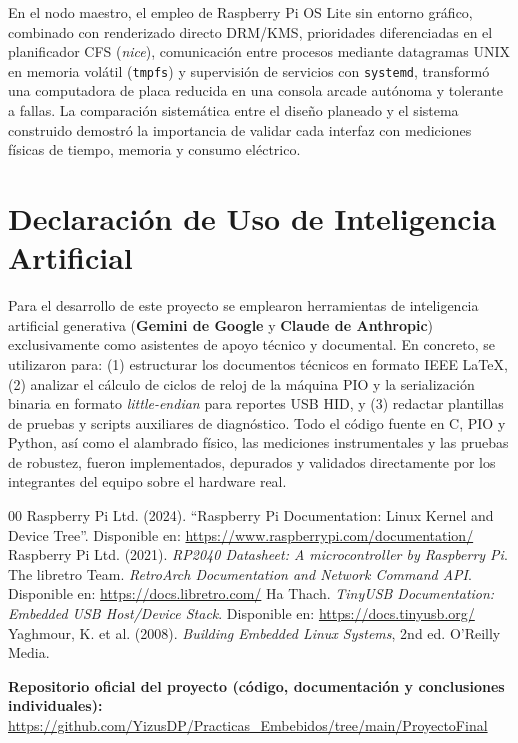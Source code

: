\documentclass[conference]{IEEEtran}
\begin{document}
En el nodo maestro, el empleo de Raspberry Pi OS Lite sin entorno gráfico, combinado con renderizado directo DRM/KMS, prioridades diferenciadas en el planificador CFS (\textit{nice}), comunicación entre procesos mediante datagramas UNIX en memoria volátil (\texttt{tmpfs}) y supervisión de servicios con \texttt{systemd}, transformó una computadora de placa reducida en una consola arcade autónoma y tolerante a fallas. La comparación sistemática entre el diseño planeado y el sistema construido demostró la importancia de validar cada interfaz con mediciones físicas de tiempo, memoria y consumo eléctrico.

\section{Declaración de Uso de Inteligencia Artificial}

Para el desarrollo de este proyecto se emplearon herramientas de inteligencia artificial generativa (\textbf{Gemini de Google} y \textbf{Claude de Anthropic}) exclusivamente como asistentes de apoyo técnico y documental. En concreto, se utilizaron para: (1) estructurar los documentos técnicos en formato IEEE \LaTeX{}, (2) analizar el cálculo de ciclos de reloj de la máquina PIO y la serialización binaria en formato \textit{little-endian} para reportes USB HID, y (3) redactar plantillas de pruebas y scripts auxiliares de diagnóstico. Todo el código fuente en C, PIO y Python, así como el alambrado físico, las mediciones instrumentales y las pruebas de robustez, fueron implementados, depurados y validados directamente por los integrantes del equipo sobre el hardware real.

\begin{thebibliography}{00}
	 Raspberry Pi Ltd. (2024). ``Raspberry Pi Documentation: Linux Kernel and Device Tree''. Disponible en: \url{https://www.raspberrypi.com/documentation/}
	 Raspberry Pi Ltd. (2021). \textit{RP2040 Datasheet: A microcontroller by Raspberry Pi}.
	 The libretro Team. \textit{RetroArch Documentation and Network Command API}. Disponible en: \url{https://docs.libretro.com/}
	 Ha Thach. \textit{TinyUSB Documentation: Embedded USB Host/Device Stack}. Disponible en: \url{https://docs.tinyusb.org/}
	 Yaghmour, K. et al. (2008). \textit{Building Embedded Linux Systems}, 2nd ed. O'Reilly Media.
\end{thebibliography}

\vspace{0.3cm}
\noindent\textbf{Repositorio oficial del proyecto (código, documentación y conclusiones individuales):} \\
\url{https://github.com/YizusDP/Practicas_Embebidos/tree/main/ProyectoFinal}
\end{document}
